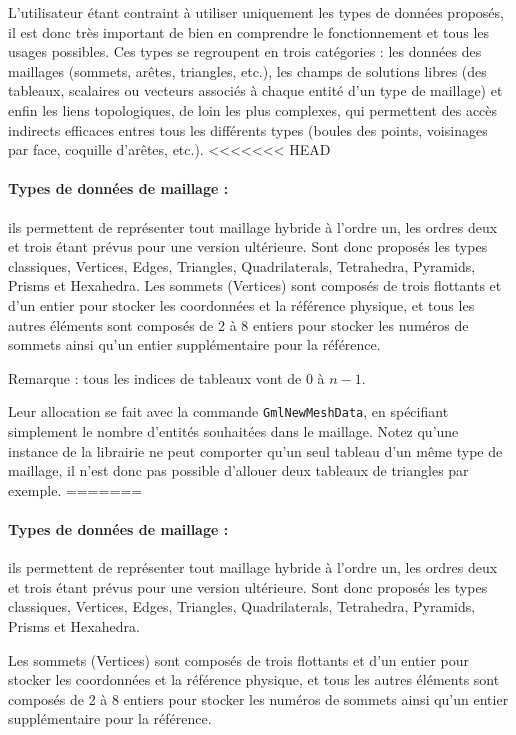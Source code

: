 \documentclass[a4paper,12pt]{article}
\begin{document}
L'utilisateur étant contraint à utiliser uniquement les types de données proposés, il est donc très important de bien en comprendre le fonctionnement et tous les usages possibles.
Ces types se regroupent en trois catégories : les données des maillages (sommets, arêtes, triangles, etc.), les champs de solutions libres (des tableaux, scalaires ou vecteurs associés à chaque entité d'un type de maillage) et enfin les liens topologiques, de loin les plus complexes, qui permettent des accès indirects efficaces entres tous les différents types (boules des points, voisinages par face, coquille d'arêtes, etc.).
<<<<<<< HEAD

\paragraph{Types de données de maillage :} ils permettent de représenter tout maillage hybride à l'ordre un, les ordres deux et trois étant prévus pour une version ultérieure.
Sont donc proposés les types classiques, Vertices, Edges, Triangles, Quadrilaterals, Tetrahedra, Pyramids, Prisms et Hexahedra.
Les sommets (Vertices) sont composés de trois flottants et d'un entier pour stocker les coordonnées et la référence physique, et tous les autres éléments sont composés de 2 à 8 entiers pour stocker les numéros de sommets ainsi qu'un entier supplémentaire pour la référence.

Remarque : tous les indices de tableaux vont de $0$ à $n-1$.

Leur allocation se fait avec la commande {\tt GmlNewMeshData}, en spécifiant simplement le nombre d'entités souhaitées dans le maillage.
Notez qu'une instance de la librairie ne peut comporter qu'un seul tableau d'un même type de maillage, il n'est donc pas possible d'allouer deux tableaux de triangles par exemple.
=======

\paragraph{Types de données de maillage :} ils permettent de représenter tout maillage hybride à l'ordre un, les ordres deux et trois étant prévus pour une version ultérieure.
Sont donc proposés les types classiques, Vertices, Edges, Triangles, Quadrilaterals, Tetrahedra, Pyramids, Prisms et Hexahedra.

Les sommets (Vertices) sont composés de trois flottants et d'un entier pour stocker les coordonnées et la référence physique, et tous les autres éléments sont composés de 2 à 8 entiers pour stocker les numéros de sommets ainsi qu'un entier supplémentaire pour la référence.
\end{document}

